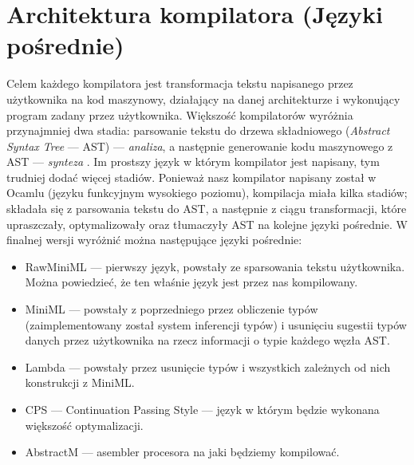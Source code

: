 \documentclass[11pt]{scrartcl}
\begin{document}
\section{Architektura kompilatora (Języki pośrednie)}
Celem każdego kompilatora jest transformacja tekstu napisanego przez użytkownika
na kod maszynowy, działający na danej architekturze i wykonujący program zadany
przez użytkownika.
Większość kompilatorów wyróżnia przynajmniej dwa stadia: parsowanie tekstu do
drzewa składniowego (\textit{Abstract Syntax Tree} --- AST) --- \textit{analiza}, a następnie
generowanie kodu maszynowego z AST --- \textit{synteza} \cite{Dragonbook}.
Im prostszy język w którym kompilator jest napisany, tym trudniej dodać więcej
stadiów.
Ponieważ nasz kompilator napisany został w Ocamlu (języku funkcyjnym wysokiego
poziomu), kompilacja miała kilka stadiów; składała się z parsowania tekstu do
AST, a następnie z ciągu transformacji, które upraszczały, optymalizowały oraz
tłumaczyły AST na kolejne języki pośrednie.
W finalnej wersji wyróżnić można następujące języki pośrednie:
\begin{itemize}
\item RawMiniML --- pierwszy język, powstały ze sparsowania tekstu użytkownika.
  Można powiedzieć, że ten właśnie język jest przez nas kompilowany.
\item MiniML --- powstały z poprzedniego przez obliczenie typów
  (zaimplementowany został system inferencji typów) i usunięciu sugestii typów
  danych przez użytkownika na rzecz informacji o typie każdego węzła AST.
\item Lambda --- powstały przez usunięcie typów i wszystkich zależnych od nich konstrukcji z MiniML.
\item CPS --- Continuation Passing Style --- język w którym będzie wykonana większość optymalizacji.
\item AbstractM --- asembler procesora na jaki będziemy kompilować.
\end{itemize}
\end{document}
